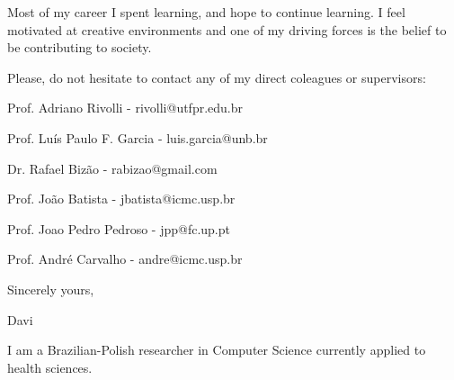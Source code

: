 \documentclass[letterpaper,11pt]{article}
\begin{document}
{\justifying
\Large
{}

Most of my career I spent learning, and hope to continue learning.
I feel motivated at creative environments and one of my driving forces is the belief to be contributing to society.

\vspace{20pt}

Please, do not hesitate to contact any of my direct coleagues or supervisors:

Prof. Adriano Rivolli - rivolli@utfpr.edu.br

Prof. Luís Paulo F. Garcia - luis.garcia@unb.br

Dr. Rafael Bizão - rabizao@gmail.com

Prof. João Batista - jbatista@icmc.usp.br

Prof. Joao Pedro Pedroso - jpp@fc.up.pt

Prof. André Carvalho - andre@icmc.usp.br

}

{\justifying
\Large
{}
\vspace{30pt}
\hspace{420pt} Sincerely yours,
\vspace{10pt}

\hspace{420pt} Davi
}

\newpage


\vspace{0.35cm}
{\justifying
I am a Brazilian-Polish researcher in Computer Science currently applied to health sciences.

}
\end{document}
